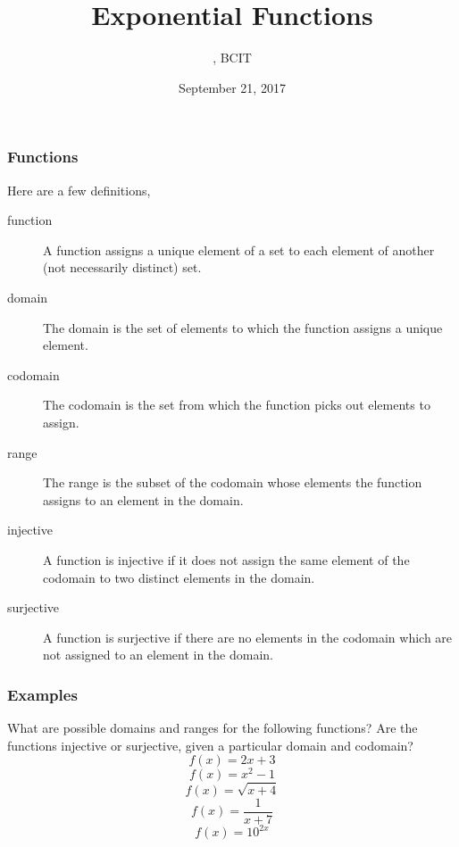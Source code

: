 \documentclass[xcolor=dvipsnames]{beamer}
\title{Exponential Functions}
\subtitle{{\CourseNumber}, BCIT}
\author{\CourseName}
\date{September 21, 2017}
\begin{document}
\begin{frame}
  \titlepage
\end{frame}

\begin{frame}
  \frametitle{Functions}
Here are a few definitions,
\begin{description}
\item[function] A function assigns a unique element of a set to each
  element of another (not necessarily distinct) set.
\item[domain] The domain is the set of elements to which the function
  assigns a unique element.
\item[codomain] The codomain is the set from which the function picks
  out elements to assign.
\item[range] The range is the subset of the codomain whose elements
  the function assigns to an element in the domain.
\item[injective] A function is injective if it does not assign the
  same element of the codomain to two distinct elements in the domain.
\item[surjective] A function is surjective if there are no elements in
  the codomain which are not assigned to an element in the domain.
\end{description}
\end{frame}

\begin{frame}
  \frametitle{Examples}
What are possible domains and ranges for the following functions? Are
the functions injective or surjective, given a particular domain and
codomain?
\begin{equation}
  \label{eq:rebiejie}
  f(x)=2x+3
\end{equation}
\begin{equation}
  \label{eq:ebaivuim}
  f(x)=x^{2}-1
\end{equation}
\begin{equation}
  \label{eq:ichievae}
  f(x)=\sqrt{x+4}
\end{equation}
\begin{equation}
  \label{eq:ejawache}
  f(x)=\frac{1}{x+7}
\end{equation}
\begin{equation}
  \label{eq:tohjuogi}
  f(x)=10^{2x}
\end{equation}
\end{frame}
\end{document}
